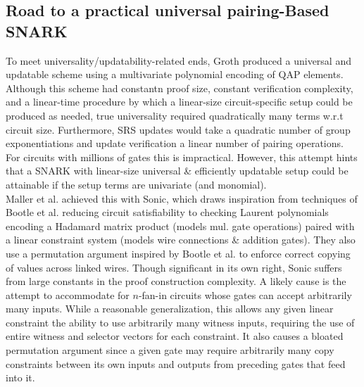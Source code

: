 \subsection{Road to a practical universal pairing-Based SNARK}
\noindent To meet universality/updatability-related ends, Groth \cite{grothupdatable} produced a universal and updatable scheme using a multivariate polynomial encoding of QAP elements. Although this scheme had constantn proof size, constant verification complexity, and a linear-time procedure by which a linear-size circuit-specific setup could be produced as needed, true universality required quadratically many terms w.r.t circuit size. Furthermore, SRS updates would take a quadratic number of group exponentiations and update verification a linear number of pairing operations. For circuits with millions of gates this is impractical. However, this attempt hints that a SNARK with linear-size universal \& efficiently updatable setup could be attainable if the setup terms are univariate (and monomial).\\ 

\noindent Maller et al. achieved this with Sonic, which draws inspiration from techniques of Bootle et al. \cite{bootlezkargs} reducing circuit satisfiability to checking Laurent polynomials encoding a Hadamard matrix product (models mul. gate operations) paired with a linear constraint system (models wire connections \& addition gates). They also use a permutation argument inspired by Bootle et al. \cite{grothshuffle} to enforce correct copying of values across linked wires. Though significant in its own right, Sonic suffers from large constants in the proof construction complexity. A likely cause is the attempt to accommodate for $n$-fan-in circuits whose gates can accept arbitrarily many inputs. While a reasonable generalization, this allows any given linear constraint the ability to use arbitrarily many witness inputs, requiring the use of entire witness and selector vectors for each constraint. It also causes a bloated permutation argument since a given gate may require arbitrarily many copy constraints between its own inputs and outputs from preceding gates that feed into it. \\ 

